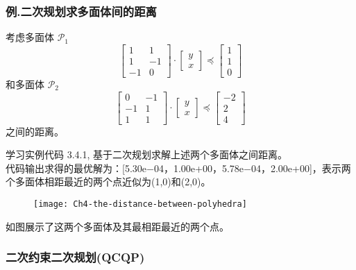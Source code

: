 \documentclass[handout]{beamer}
\begin{document}
\begin{frame}
\begin{frame}
		\frametitle{  例.二次规划求多面体间的距离}
		考虑多面体 $\mathcal{P}_1$
		$$
		\left[\begin{array}{cc}
			1 & 1 \\
			1 & -1 \\
			-1 & 0
		\end{array}\right] \cdot\left[\begin{array}{l}
			y \\
			x
		\end{array}\right] \preccurlyeq\left[\begin{array}{l}
			1 \\
			1 \\
			0
		\end{array}\right]
		$$
		和多面体 $\mathcal{P}_2$
		$$
		\left[\begin{array}{cc}
			0 & -1 \\
			-1 & 1 \\
			1 & 1
		\end{array}\right] \cdot\left[\begin{array}{c}
			y \\
			x
		\end{array}\right] \preccurlyeq\left[\begin{array}{c}
			-2 \\
			2 \\
			4
		\end{array}\right]
		$$
		之间的距离。
		\end{frame}
		
		\begin{frame}
  	学习实例代码 3.4.1,  基于二次规划求解上述两个多面体之间距离。\\
  	代码输出求得的最优解为：[5.30e−04，1.00e+00，5.78e−04，2.00e+00]，表示两个多面体相距最近的两个点近似为(1,0)和(2,0)。
		\begin{figure}
			\centering
			\texttt{[image: Ch4-the-distance-between-polyhedra]}
		\end{figure}
		
		如图展示了这两个多面体及其最相距最近的两个点。 
		\end{frame}
		
		
		
		

	\begin{frame}
		\frametitle{二次约束二次规划(QCQP)}
		

\end{frame}
\end{frame}
\end{document}
